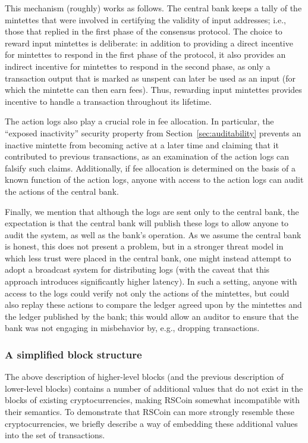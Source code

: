\documentclass[conference]{IEEEtran}
\newcommand{\rscoin}{\textsf{RSCoin}\xspace}
\begin{document}
This mechanism (roughly) works as follows.  The central bank keeps a tally
of the mintettes that were involved in certifying the validity of input
addresses; i.e., those that replied in the first phase of the consensus
protocol.  The choice to
reward input mintettes is deliberate: in addition to providing a direct
incentive for mintettes to respond in the first phase of the protocol, it
also provides an indirect incentive for mintettes to respond in the second
phase, as only a transaction output that is marked as unspent can later be
used as an input (for which the mintette can then earn fees).  Thus,
rewarding input mintettes provides incentive to handle a transaction
throughout its lifetime.

The action logs also play a crucial role in fee allocation.  In particular,
the
``exposed inactivity'' security property from Section~\ref{sec:auditability}
prevents an inactive mintette from
becoming active at a later time and claiming that it contributed to previous
transactions, as an examination of the action logs can falsify such claims.
Additionally, if fee allocation is determined on the basis of a known function
of the action logs, anyone with access to the action logs can audit the
actions of the central bank.

Finally, we mention that although the logs are sent only to the central bank,
the expectation is that the central bank will publish these logs to allow
anyone to audit the system, as well as the bank's operation.  As we assume the
central bank is honest, this
does not present a problem, but in a stronger threat model in which less trust
were placed in the central bank, one might instead attempt to adopt a
broadcast system for distributing logs (with the caveat that this approach
introduces significantly higher latency).  In such a setting, anyone with
access to the logs could verify not only the actions of the mintettes, but
could also replay these actions to compare the ledger agreed upon by the
mintettes and the ledger published by the bank; this would allow an auditor to
ensure that the bank was not engaging in misbehavior by, e.g.,
dropping transactions.

\subsubsection{A simplified block structure}\label{sec:embedding}

The above description of higher-level blocks (and the previous description of
lower-level blocks) contains a number of additional values that do not exist
in the blocks of existing cryptocurrencies, making \rscoin somewhat
incompatible with their semantics.  To demonstrate that \rscoin can more
strongly resemble these cryptocurrencies, we briefly describe a way of
embedding these additional values into the set of transactions.
\end{document}
